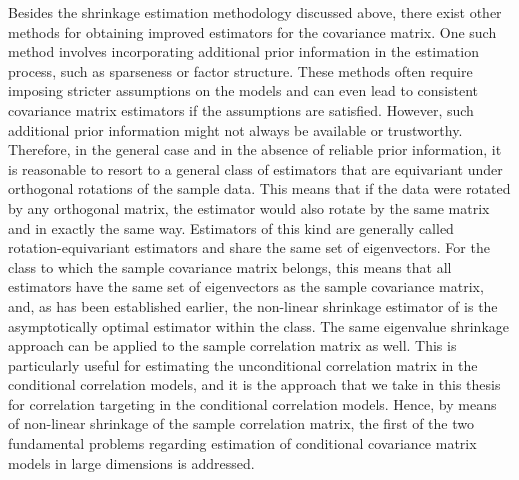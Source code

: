 Besides the shrinkage estimation methodology discussed above, there exist other methods for obtaining improved estimators for the covariance matrix. One such method involves incorporating additional prior information in the estimation process, such as sparseness or factor structure. These methods often require imposing stricter assumptions on the models and can even lead to consistent covariance matrix estimators if the assumptions are satisfied. However, such additional prior information might not always be available or trustworthy. Therefore, in the general case and in the absence of reliable prior information, it is reasonable to resort to a general class of estimators that are equivariant under orthogonal rotations of the sample data. This means that if the data were rotated by any orthogonal matrix, the estimator would also rotate by the same matrix and in exactly the same way. Estimators of this kind are generally called rotation-equivariant estimators and share the same set of eigenvectors. For the class to which the sample covariance matrix belongs, this means that all estimators have the same set of eigenvectors as the sample covariance matrix, and, as has been established earlier, the non-linear shrinkage estimator of \textcite{LEDOITWOLF2015} is the asymptotically optimal estimator within the class. The same eigenvalue shrinkage approach can be applied to the sample correlation matrix as well. This is particularly useful for estimating the unconditional correlation matrix in the conditional correlation models, and it is the approach that we take in this thesis for correlation targeting in the conditional correlation models. Hence, by means of non-linear shrinkage of the sample correlation matrix, the first of the two fundamental problems regarding estimation of conditional covariance matrix models in large dimensions is addressed.

